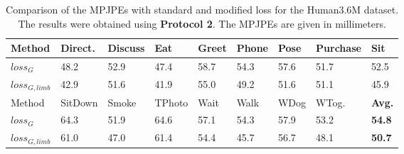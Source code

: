 \begin{table}[bt]	
	\centering
	\begin{tabularx}{\textwidth}{l *{8}{Y}}
		\toprule
		Method & Direct. & Discuss & Eat & Greet & Phone & Pose & Purchase & Sit \\
		\midrule
		$loss_G$ & 48.2 & 52.9 & 47.4 & 58.7 & 54.3 & 57.6 & 51.7 & 52.5\\
		$loss_{G, limb}$ & 42.9 & 51.6 & 41.9 & 55.0 & 49.2 & 51.6 & 51.1 & 45.9 \\
		\bottomrule
		\toprule
		Method & SitDown & Smoke & TPhoto & Wait & Walk & WDog & WTog. & \textbf{Avg.}\\
		\midrule
		$loss_G$ & 64.3 & 51.9 & 64.6 & 57.1 & 54.3 & 57.9 & 53.2 & \textbf{54.8} \\
		$loss_{G, limb}$ & 61.0 & 47.0 & 61.4 & 54.4 & 45.7 & 56.7 & 48.1 & \textbf{50.7} \\
		\bottomrule
	\end{tabularx}
	\caption{
		Comparison of the MPJPEs with standard and modified loss for the Human3.6M dataset. 
		The results were obtained using \textbf{Protocol 2}. The MPJPEs are given in millimeters.
	 }
	\label{tbl:results-limb-loss}
\end{table}